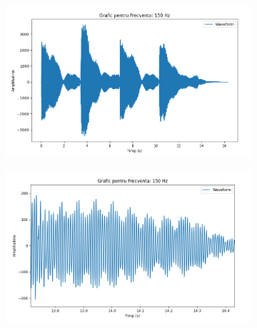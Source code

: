 \documentclass[12pt]{article}
\begin{document}
\begin{figure}[H]
	\centering
	\begin{subfigure}[b]{1\textwidth}
		\includegraphics[width=\linewidth]{grafic3.png}
	\end{subfigure}
	\hfill
	\begin{subfigure}[b]{1\textwidth}
		\includegraphics[width=\linewidth]{grafic4.png}
	\end{subfigure}
\end{figure}

\newpage
\end{document}
